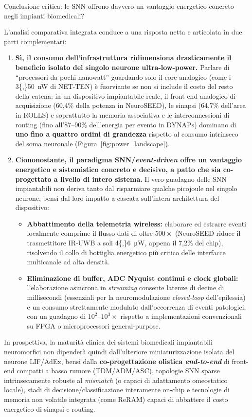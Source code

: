\begin{criticaBox}[top=5pt, bottom=5pt, before skip=2pt, after skip=2pt]{Conclusione critica: le SNN offrono davvero un vantaggio energetico concreto negli impianti biomedicali?}
{\footnotesize\setlength{\baselineskip}{10.5pt}
L'analisi comparativa integrata conduce a una risposta netta e articolata in due parti complementari:
\begin{enumerate}[topsep=2pt, itemsep=1.5pt]
  \item \textbf{Sì, il consumo dell'infrastruttura ridimensiona drasticamente il beneficio isolato del singolo neurone ultra-low-power.} Parlare di ``processori da pochi nanowatt'' guardando solo il core analogico (come i \SI{3{,}50}{\nano\watt} di NET-TEN) è fuorviante se non si include il costo del resto della catena: in un dispositivo impiantabile reale, il front-end analogico di acquisizione (60,4\% della potenza in NeuroSEED), le sinapsi (64,7\% dell'area in ROLLS) e soprattutto la memoria associativa e le interconnessioni di routing (fino all'87--90\% dell'energia per evento in DYNAPs) dominano di \textbf{uno fino a quattro ordini di grandezza} rispetto al consumo intrinseco del soma neuronale (Figura~\ref{fig:power_landscape}).
  \item \textbf{Ciononostante, il paradigma SNN/\emph{event-driven} offre un vantaggio energetico e sistemistico concreto e decisivo, a patto che sia co-progettato a livello di intero sistema.} Il vero guadagno delle SNN impiantabili non deriva tanto dal risparmiare qualche picojoule nel singolo neurone, bensì dal loro impatto a cascata sull'intera architettura del dispositivo:
  \begin{itemize}[topsep=1.5pt, itemsep=1pt]
    \item \textbf{Abbattimento della telemetria wireless:} elaborare ed estrarre eventi localmente comprime il flusso dati di oltre $500\times$ (NeuroSEED riduce il trasmettitore IR-UWB a soli \SI{4{,}6}{\micro\watt}, appena il 7,2\% del chip), risolvendo il collo di bottiglia energetico più critico delle interfacce multicanale ad alta densità.
    \item \textbf{Eliminazione di buffer, ADC Nyquist continui e clock globali:} l'elaborazione asincrona in \emph{streaming} consente latenze di decine di millisecondi (essenziali per la neuromodulazione \emph{closed-loop} dell'epilessia) e un consumo strettamente modulato dall'occorrenza di eventi patologici, con un guadagno di $10^2\text{--}10^3\times$ rispetto a implementazioni convenzionali su FPGA o microprocessori general-purpose.
  \end{itemize}
\end{enumerate}
In prospettiva, la maturità clinica dei sistemi biomedicali impiantabili neuromorfici non dipenderà quindi dall'ulteriore miniaturizzazione isolata del neurone LIF/AdEx, bensì dalla \textbf{co-progettazione olistica \emph{end-to-end}} di front-end compatti a basso rumore (TDM/ADM/ASC), topologie SNN sparse intrinsecamente robuste al \emph{mismatch} (o capaci di adattamento omeostatico locale), stadi di decisione/classificazione interamente on-chip e tecnologie di memoria non volatile integrata (come ReRAM) capaci di abbattere il costo energetico di sinapsi e routing.
}
\end{criticaBox}
